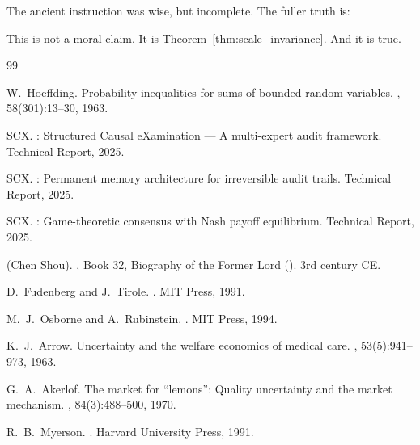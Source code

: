 \documentclass[11pt,a4paper]{article}
\theoremstyle{definition}
\theoremstyle{remark}
\begin{document}
The ancient instruction  was wise, but incomplete. The fuller truth is:

\begin{center}
\end{center}

\medskip
This is not a moral claim. It is Theorem~\ref{thm:scale_invariance}. And it is true.

\begin{thebibliography}{99}

W.~Hoeffding.
\newblock Probability inequalities for sums of bounded random variables.
, 58(301):13--30, 1963.

SCX.
: Structured Causal eXamination --- A multi-expert audit framework.
\newblock Technical Report, 2025.

SCX.
: Permanent memory architecture for irreversible audit trails.
\newblock Technical Report, 2025.

SCX.
: Game-theoretic consensus with Nash payoff equilibrium.
\newblock Technical Report, 2025.

 (Chen Shou).
, Book 32, Biography of the Former Lord ().
\newblock 3rd century CE.

D.~Fudenberg and J.~Tirole.
.
\newblock MIT Press, 1991.

M.~J.~Osborne and A.~Rubinstein.
.
\newblock MIT Press, 1994.

K.~J.~Arrow.
\newblock Uncertainty and the welfare economics of medical care.
, 53(5):941--973, 1963.

G.~A.~Akerlof.
\newblock The market for ``lemons'': Quality uncertainty and the market mechanism.
, 84(3):488--500, 1970.

R.~B.~Myerson.
.
\newblock Harvard University Press, 1991.

\end{thebibliography}
\end{document}
